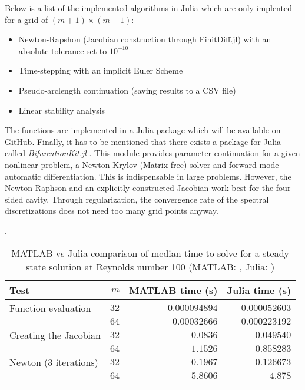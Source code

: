 Below is a list of the implemented algorithms in Julia which are only implented
for a grid of $(m+1) \times (m+1)$:

\begin{itemize}
  \item Newton-Rapshon (Jacobian construction through FinitDiff.jl) with an absolute tolerance
    set to $10^{-10}$
  \item Time-stepping with an implicit Euler Scheme
  \item Pseudo-arclength continuation (saving results to a CSV file)
  \item Linear stability analysis
\end{itemize}

The functions are implemented in a Julia package which will be available on
GitHub. Finally, it has to be mentioned that there exists a package for Julia
called \emph{BifurcationKit.jl} \citep{veltz2020}. This module provides
parameter continuation for a given nonlinear problem, a Newton-Krylov
(Matrix-free) solver and forward mode automatic differentiation. This is
indispensable in large problems. However, the Newton-Raphson and an explicitly
constructed Jacobian work best for the four-sided cavity. Through
regularization, the convergence rate of the spectral discretizations does not
need too many grid points anyway.

\begin{table}[ht]
  \caption{MATLAB vs Julia comparison of median time to solve for a steady
    state solution at Reynolds number 100 (MATLAB: , Julia: )}.
  \label{tab:matlab_julia}
\begin{tabular}{lrrr}
Test & $m$ & MATLAB time (s) & Julia time (s) \\
\hline
Function evaluation  & $32$ & $0.000094894$  & $0.000052603$ \\
& $64$ & $0.00032666$ & $0.000223192$ \\
 Creating the Jacobian  & $32$ & $0.0836$  &  $0.049540$  \\
& $64$ & $1.1526$ & $0.858283$ \\
Newton (3 iterations)  & $32$ & $0.1967$ & $0.126673$ \\
& $64$ & $5.8606$  & $4.878$ \\
\label{tab:comp}
\end{tabular}
\end{table}

